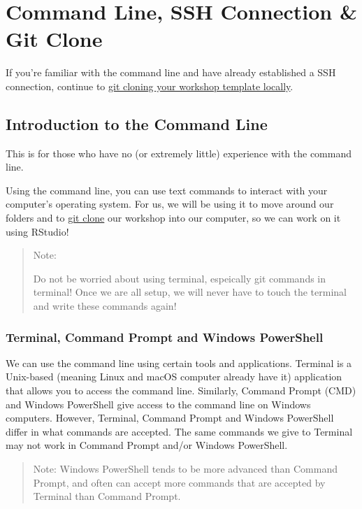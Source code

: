 \documentclass[
]{book}
\theoremstyle{definition}
\theoremstyle{definition}
\theoremstyle{definition}
\theoremstyle{definition}
\theoremstyle{remark}
\begin{document}
\chapter{Command Line, SSH Connection \& Git Clone}\label{command-line-ssh-connection-git-clone}

If you're familiar with the command line and have already established a SSH connection, continue to \hyperref[git-clone]{git cloning your workshop template locally}.

\section{Introduction to the Command Line}\label{introduction-to-the-command-line}

This is for those who have no (or extremely little) experience with the command line.

Using the command line, you can use text commands to interact with your computer's operating system. For us, we will be using it to move around our folders and to \hyperref[git-clone]{git clone} our workshop into our computer, so we can work on it using RStudio!

\begin{quote}
Note:

Do not be worried about using terminal, espeically git commands in terminal! Once we are all setup, we will never have to touch the terminal and write these commands again!
\end{quote}

\subsection{Terminal, Command Prompt and Windows PowerShell}\label{terminal-command-prompt-and-windows-powershell}

We can use the command line using certain tools and applications. Terminal is a Unix-based (meaning Linux and macOS computer already have it) application that allows you to access the command line. Similarly, Command Prompt (CMD) and Windows PowerShell give access to the command line on Windows computers. However, Terminal, Command Prompt and Windows PowerShell differ in what commands are accepted. The same commands we give to Terminal may not work in Command Prompt and/or Windows PowerShell.

\begin{quote}
Note: Windows PowerShell tends to be more advanced than Command Prompt, and often can accept more commands that are accepted by Terminal than Command Prompt.
\end{quote}
\end{document}
